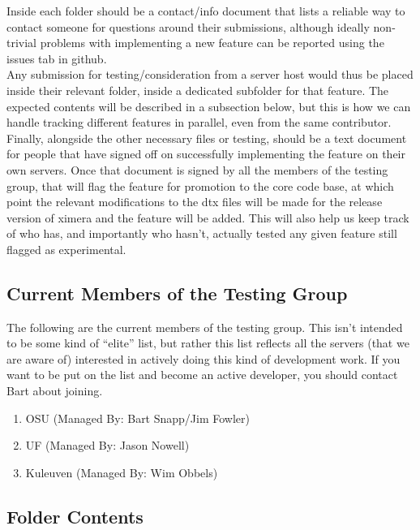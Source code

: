 \documentclass{ximera}
\begin{document}
    Inside each folder should be a contact/info document that lists a reliable way to contact someone for questions around their submissions, although ideally non-trivial problems with implementing a new feature can be reported using the issues tab in github.\\
    
    Any submission for testing/consideration from a server host would thus be placed inside their relevant folder, inside a dedicated subfolder for that feature. The expected contents will be described in a subsection below, but this is how we can handle tracking different features in parallel, even from the same contributor.\\
    
    Finally, alongside the other necessary files or testing, should be a text document for people that have signed off on successfully implementing the feature on their own servers. Once that document is signed by all the members of the testing group, that will flag the feature for promotion to the core code base, at which point the relevant modifications to the dtx files will be made for the release version of ximera and the feature will be added. This will also help us keep track of who has, and importantly who hasn't, actually tested any given feature still flagged as experimental.\\
    
    \subsection{Current Members of the Testing Group}
    
        The following are the current members of the testing group. This isn't intended to be some kind of ``elite'' list, but rather this list reflects all the servers (that we are aware of) interested in actively doing this kind of development work. If you want to be put on the list and become an active developer, you should contact Bart about joining.
        \begin{enumerate}
            \item OSU (Managed By: Bart Snapp/Jim Fowler)
            \item UF (Managed By: Jason Nowell)
            \item Kuleuven (Managed By: Wim Obbels)
        \end{enumerate}
    
    \subsection{Folder Contents}
        
\end{document}
